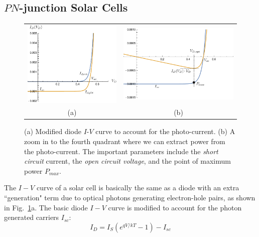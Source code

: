 \subsection{$PN$-junction Solar Cells}
\begin{figure}[tb]
\centering
\begin{tabular}{cc}
\includegraphics[width=.45\columnwidth]{solarcell_zoomout.pdf} &
\includegraphics[width=.45\columnwidth]{solarcell.pdf}\\
(a) & (b)\\
\end{tabular}
\caption{(a) Modified diode $I$-$V$ curve to account for the photo-current.  (b)  A zoom in to the fourth quadrant where we can extract power from the photo-current.  The important parameters include the \emph{short circuit} current, the \emph{open circuit voltage}, and the point of maximum power $P_{max}$. }
\label{fig:solarcell_zoom}
\end{figure}
The $I-V$ curve of a solar cell is basically the same as a diode with an extra ``generation" term  due to optical photons generating electron-hole pairs, as shown in Fig.~\ref{fig:solarcell_zoom}a.  The basic diode $I-V$ curve is modified to account for the photon generated carriers $I_{sc}$:
    \begin{equation} 
        I_D = I_S (e^{qV/kT} - 1) - I_{sc}
    \end{equation}
